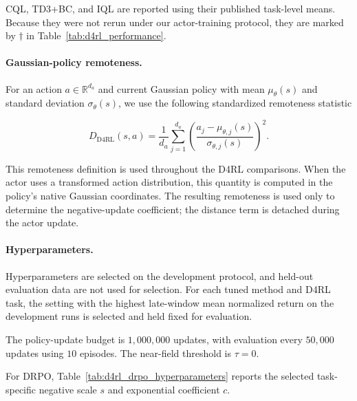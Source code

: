 \documentclass{article}
\theoremstyle{plain}
\theoremstyle{definition}
\theoremstyle{remark}
\begin{document}
CQL, TD3+BC, and IQL are reported using their published task-level means.
Because they were not rerun under our actor-training protocol, they are marked
by \(\dagger\) in Table~\ref{tab:d4rl_performance}.

\paragraph{Gaussian-policy remoteness.}

For an action \(a\in\mathbb{R}^{d_a}\) and current Gaussian policy with
mean \(\mu_\theta(s)\) and standard deviation \(\sigma_\theta(s)\), we use the
following standardized remoteness statistic

\[
D_{\mathrm{D4RL}}(s,a)
=
\frac{1}{d_a}
\sum_{j=1}^{d_a}
\left(
\frac{a_j-\mu_{\theta,j}(s)}
     {\sigma_{\theta,j}(s)}
\right)^2.
\]

This remoteness definition is used throughout the D4RL comparisons.
When the actor uses a transformed action distribution, this quantity is
computed in the policy's native Gaussian coordinates. The resulting
remoteness is used only to determine the negative-update coefficient;
the distance term is detached during the actor update.

\paragraph{Hyperparameters.}

Hyperparameters are selected on the development protocol, and held-out
evaluation data are not used for selection. For each tuned method and D4RL
task, the setting with the highest late-window mean normalized return on the
development runs is selected and held fixed for evaluation.

The policy-update budget is $1{,}000{,}000$ updates, with evaluation every
$50{,}000$ updates using $10$ episodes. The near-field threshold is
$\tau=0$.

For DRPO, Table~\ref{tab:d4rl_drpo_hyperparameters} reports the selected
task-specific negative scale \(s\) and exponential coefficient \(c\).
\end{document}
